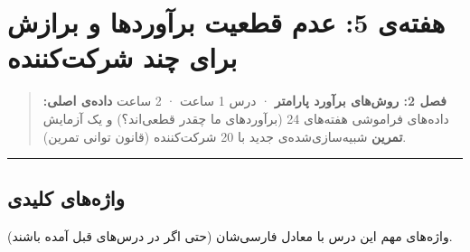 \section{هفته‌ی 5: عدم قطعیت برآوردها و برازش برای چند شرکت‌کننده}

\begin{quote}
\textbf{فصل 2: روش‌های برآورد پارامتر} · درس 1 ساعت ·  2 ساعت
\textbf{داده‌ی اصلی:} داده‌های فراموشی هفته‌های 2\lr{--}4 (برآوردهای ما چقدر
قطعی‌اند؟) و یک آزمایش \textbf{تمرین}  شبیه‌سازی‌شده‌ی جدید
با 20 شرکت‌کننده (قانون توانی تمرین).
\end{quote}

\begin{center}\rule{0.5\linewidth}{0.5pt}\end{center}

\subsection{واژه‌های کلیدی}

واژه‌های مهم این درس با معادل فارسی‌شان (حتی اگر در درس‌های قبل آمده
باشند).

